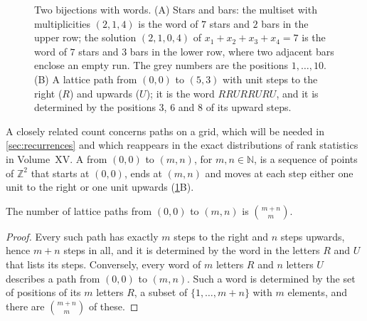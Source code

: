 \begin{figure}
\hfill
{}
\caption{Two bijections with words. (A) Stars and bars: the multiset with multiplicities $(2,1,4)$ is the word of $7$ stars and $2$ bars in the upper row; the solution $(2,1,0,4)$ of $x_1+x_2+x_3+x_4=7$ is the word of $7$ stars and $3$ bars in the lower row, where two adjacent bars enclose an empty run. The grey numbers are the positions $1,\ldots,10$. (B) A lattice path from $(0,0)$ to $(5,3)$ with unit steps to the right ($R$) and upwards ($U$); it is the word $RRURRURU$, and it is determined by the positions $3$, $6$ and $8$ of its upward steps.}
\label{fig:stars-bars}
\end{figure}

A closely related count concerns paths on a grid, which will be needed in \cref{sec:recurrences} and which reappears in the exact distributions of rank statistics in Volume~XV. A  from $(0,0)$ to $(m,n)$, for $m,n\in\mathbb N$, is a sequence of points of $\mathbb Z^2$ that starts at $(0,0)$, ends at $(m,n)$ and moves at each step either one unit to the right or one unit upwards (\cref{fig:stars-bars}B).

\begin{proposition}
\label{prop:lattice-paths}
The number of lattice paths from $(0,0)$ to $(m,n)$ is $\binom{m+n}{m}$.
\end{proposition}

\begin{proof}
Every such path has exactly $m$ steps to the right and $n$ steps upwards, hence $m+n$ steps in all, and it is determined by the word in the letters $R$ and $U$ that lists its steps. Conversely, every word of $m$ letters $R$ and $n$ letters $U$ describes a path from $(0,0)$ to $(m,n)$. Such a word is determined by the set of positions of its $m$ letters $R$, a subset of $\{1,\ldots,m+n\}$ with $m$ elements, and there are $\binom{m+n}{m}$ of these.
\end{proof}

